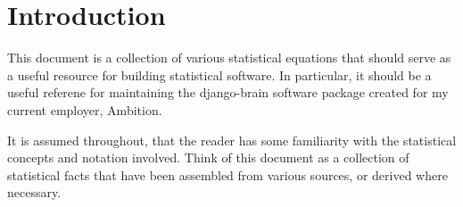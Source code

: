 \documentclass[../../main.tex]{subfiles}
\begin{document}
\chapter{Introduction}
This document is a collection of various statistical equations that should
serve as a useful resource for building statistical software.  In particular,
it should be a useful referene for maintaining the django-brain software
package created for my current employer, Ambition.

It is assumed throughout, that the reader has some familiarity with the
statistical concepts and notation involved.  Think of this document as a
collection of statistical facts that have been assembled from various sources,
or derived where necessary.
\end{document}
